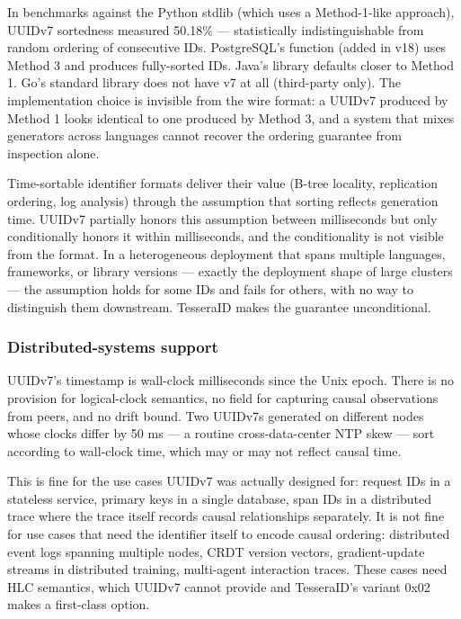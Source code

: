 In benchmarks against the Python  stdlib (which uses a Method-1-like approach), UUIDv7 sortedness measured 50.18\% --- statistically indistinguishable from random ordering of consecutive IDs. PostgreSQL's  function (added in v18) uses Method 3 and produces fully-sorted IDs. Java's  library defaults closer to Method 1. Go's standard library does not have v7 at all (third-party only). The implementation choice is invisible from the wire format: a UUIDv7 produced by Method 1 looks identical to one produced by Method 3, and a system that mixes generators across languages cannot recover the ordering guarantee from inspection alone.

\begin{calloutwarning}
Time-sortable identifier formats deliver their value (B-tree locality, replication ordering, log analysis) through the assumption that sorting reflects generation time. UUIDv7 partially honors this assumption between milliseconds but only conditionally honors it within milliseconds, and the conditionality is not visible from the format. In a heterogeneous deployment that spans multiple languages, frameworks, or library versions --- exactly the deployment shape of large clusters --- the assumption holds for some IDs and fails for others, with no way to distinguish them downstream. TesseraID makes the guarantee unconditional.
\end{calloutwarning}

\subsubsection{Distributed-systems support}

UUIDv7's timestamp is wall-clock milliseconds since the Unix epoch. There is no provision for logical-clock semantics, no field for capturing causal observations from peers, and no drift bound. Two UUIDv7s generated on different nodes whose clocks differ by 50 ms --- a routine cross-data-center NTP skew --- sort according to wall-clock time, which may or may not reflect causal time.

This is fine for the use cases UUIDv7 was actually designed for: request IDs in a stateless service, primary keys in a single database, span IDs in a distributed trace where the trace itself records causal relationships separately. It is not fine for use cases that need the identifier itself to encode causal ordering: distributed event logs spanning multiple nodes, CRDT version vectors, gradient-update streams in distributed training, multi-agent interaction traces. These cases need HLC semantics, which UUIDv7 cannot provide and TesseraID's variant 0x02 makes a first-class option.

